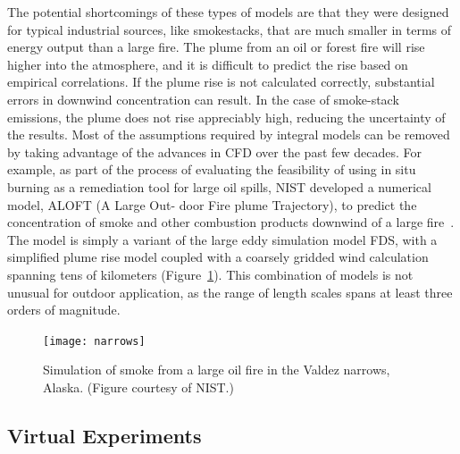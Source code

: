 \documentclass[graybox]{svmult}
\begin{document}
The potential shortcomings of these types of models are that they were designed for typical industrial sources, like smokestacks, that are much smaller in terms of energy output than a large fire. The plume from an oil or forest fire will rise higher into the atmosphere, and it is difficult to predict the rise based on empirical correlations. If the plume rise is not calculated correctly, substantial errors in downwind concentration can result. In the case of smoke-stack emissions, the plume does not rise appreciably high, reducing the uncertainty of the results.
Most of the assumptions required by integral models can be removed by taking advantage of the advances in CFD over the past few decades. For example, as part of the process of evaluating the feasibility of using in situ burning as a remediation tool for large oil spills, NIST developed a numerical model, ALOFT (A Large Out- door Fire plume Trajectory), to predict the concentration of smoke and other combustion products downwind of a large fire~\cite{Baum}. The model is simply a variant of the large eddy simulation model FDS, with a simplified plume rise model coupled with a coarsely gridded wind calculation spanning tens of kilometers (Figure~\ref{ALOFT}). This combination of models is not unusual for outdoor application, as the range of length scales spans at least three orders of magnitude.

\begin{figure}[b]
\texttt{[image: narrows]}
\caption{Simulation of smoke from a large oil fire in the Valdez narrows, Alaska. (Figure courtesy of NIST.)}
\label{ALOFT}
\end{figure}






\subsection{Virtual Experiments}
\end{document}
